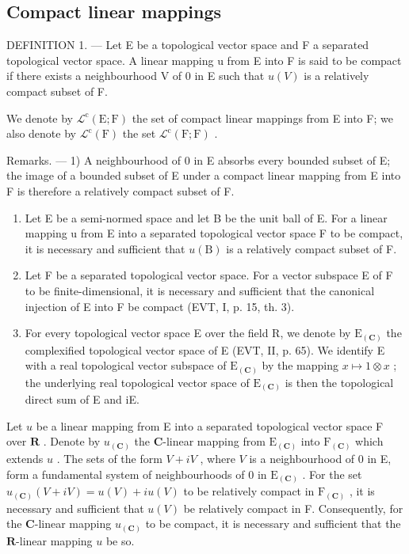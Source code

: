 \subsection{Compact linear mappings}

DEFINITION 1. --- Let E be a topological vector space and F a separated topological vector space. A linear mapping u from E into F is said to be compact if there exists a neighbourhood V of 0 in E such that \(u(V)\) is a relatively compact subset of F.

We denote by \(\mathcal{L}^{\mathrm{c}}(\mathrm{E};\mathrm{F})\) the set of compact linear mappings from E into F; we also denote by \(\mathcal{L}^{\mathrm{c}}(\mathrm{F})\) the set \(\mathcal{L}^{\mathrm{c}}(\mathrm{F};\mathrm{F})\) .

Remarks. --- 1) A neighbourhood of 0 in E absorbs every bounded subset of E; the image of a bounded subset of E under a compact linear mapping from E into F is therefore a relatively compact subset of F.

\begin{enumerate}
\def\labelenumi{\arabic{enumi})}
\setcounter{enumi}{1}
\item
  Let E be a semi-normed space and let B be the unit ball of E. For a linear mapping u from E into a separated topological vector space F to be compact, it is necessary and sufficient that \(u(\mathrm{B})\) is a relatively compact subset of F.
\item
  Let F be a separated topological vector space. For a vector subspace E of F to be finite-dimensional, it is necessary and sufficient that the canonical injection of E into F be compact (EVT, I, p. 15, th. 3).
\item
  For every topological vector space E over the field R, we denote by \(\mathrm{E}_{(\mathbf{C})}\) the complexified topological vector space of E (EVT, II, p. 65). We identify E with a real topological vector subspace of \(\mathrm{E}_{(\mathbf{C})}\) by the mapping \(x \mapsto 1 \otimes x\) ; the underlying real topological vector space of \(\mathrm{E}_{(\mathbf{C})}\) is then the topological direct sum of E and iE.
\end{enumerate}

Let \(u\) be a linear mapping from E into a separated topological vector space F over \(\mathbf{R}\) . Denote by \(u_{(\mathbf{C})}\) the \(\mathbf{C}\)-linear mapping from \(\mathrm{E}_{(\mathbf{C})}\) into \(\mathrm{F}_{(\mathbf{C})}\) which extends \(u\) . The sets of the form \(V + iV\) , where \(V\) is a neighbourhood of 0 in E, form a fundamental system of neighbourhoods of 0 in \(\mathrm{E}_{(\mathbf{C})}\) . For the set \(u_{(\mathbf{C})}(V + iV) = u(V) + iu(V)\) to be relatively compact in \(\mathrm{F}_{(\mathbf{C})}\) , it is necessary and sufficient that \(u(V)\) be relatively compact in F. Consequently, for the \(\mathbf{C}\)-linear mapping \(u_{(\mathbf{C})}\) to be compact, it is necessary and sufficient that the \(\mathbf{R}\)-linear mapping \(u\) be so.

